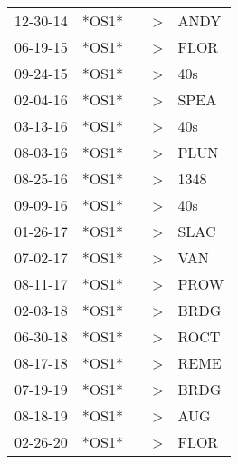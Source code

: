 \begin{supertabular}{lllll}
 12-30-14 &  *OS1* &   &  \textgreater &  ANDY \\
 06-19-15 &  *OS1* &   &  \textgreater &  FLOR \\
 09-24-15 &  *OS1* &   &  \textgreater &   40s \\
 02-04-16 &  *OS1* &   &  \textgreater &  SPEA \\
 03-13-16 &  *OS1* &   &  \textgreater &   40s \\
 08-03-16 &  *OS1* &   &  \textgreater &  PLUN \\
 08-25-16 &  *OS1* &   &  \textgreater &  1348 \\
 09-09-16 &  *OS1* &   &  \textgreater &   40s \\
 01-26-17 &  *OS1* &   &  \textgreater &  SLAC \\
 07-02-17 &  *OS1* &   &  \textgreater &   VAN \\
 08-11-17 &  *OS1* &   &  \textgreater &  PROW \\
 02-03-18 &  *OS1* &   &  \textgreater &  BRDG \\
 06-30-18 &  *OS1* &   &  \textgreater &  ROCT \\
 08-17-18 &  *OS1* &   &  \textgreater &  REME \\
 07-19-19 &  *OS1* &   &  \textgreater &  BRDG \\
 08-18-19 &  *OS1* &   &  \textgreater &   AUG \\
 02-26-20 &  *OS1* &   &  \textgreater &  FLOR \\
\end{supertabular}
